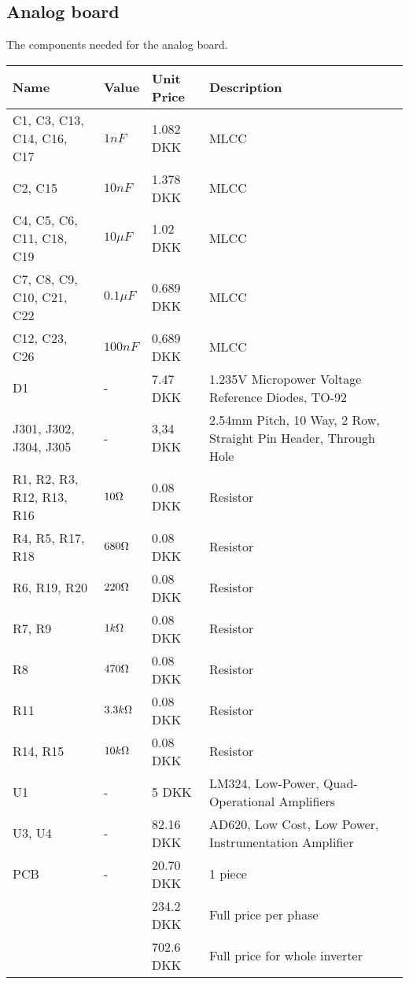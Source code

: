 \subsection{Analog board}
The components needed for the analog board.
\begin{table}[H]
\centering
\footnotesize
\begin{tabular}{|p{4cm} p{1.5cm} p{2.2cm} p{6cm}|} \hline
\textbf{Name}              & \textbf{Value} & \textbf{Unit Price}    & \textbf{Description} \\ \hline
C1, C3, C13, C14, C16, C17 & $1nF$          & 1.082 DKK          &     MLCC  \\
C2, C15                    & $10nF$         & 1.378 DKK          &     MLCC  \\
C4, C5, C6, C11, C18, C19  & $10\mu F$      & 1.02 DKK          &     MLCC  \\
C7, C8, C9, C10, C21, C22  & $0.1\mu F$     & 0.689 DKK           &     MLCC \\
C12, C23, C26              & $100nF$        & 0,689 DKK          &     MLCC  \\
D1                         & -              & 7.47 DKK & 1.235V Micropower Voltage Reference Diodes, TO-92   \\
J301, J302, J304, J305     &  -             & 3,34 DKK & 2.54mm Pitch, 10 Way, 2 Row, Straight Pin Header, Through Hole \\
R1, R2, R3, R12, R13, R16  & $10 \ohm$    & 0.08 DKK& Resistor  \\
R4, R5, R17, R18           & $680 \ohm$   & 0.08 DKK& Resistor  \\
R6, R19, R20               & $220 \ohm$   & 0.08 DKK& Resistor  \\
R7, R9                     & $1k \ohm$    & 0.08 DKK& Resistor  \\
R8                         & $470 \ohm$   & 0.08 DKK& Resistor  \\
R11                        & $3.3k \ohm$  & 0.08 DKK& Resistor  \\
R14, R15                   & $10k \ohm$   & 0.08 DKK& Resistor \\
U1                         & -              & 5    DKK& LM324, Low-Power, Quad-Operational Amplifiers       \\
U3, U4                     & -              & 82.16 DKK& AD620, Low Cost, Low Power, Instrumentation Amplifier \\ 
PCB               & -                  & 20.70 DKK  & 1 piece         \\ \hline
& & 234.2 DKK & Full price per phase \\ \hline
& & 702.6 DKK & Full price for whole inverter \\ \hline
\end{tabular}
\end{table}



